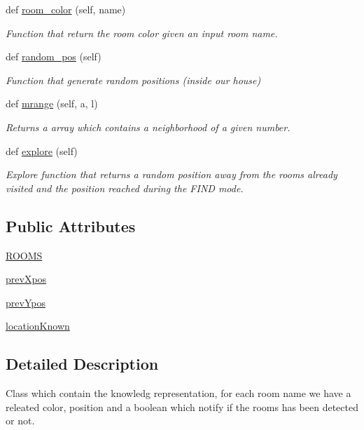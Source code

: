 \begin{DoxyCompactItemize}
def \hyperlink{classknowledgeRep_1_1Rooms_a41f6960d862a174fce8200ea1c7e003f}{room\+\_\+color} (self, name)
\begin{DoxyCompactList}\small\item\em Function that return the room color given an input room name. \end{DoxyCompactList}\item 
def \hyperlink{classknowledgeRep_1_1Rooms_ae666c5c43dcaa315e41d7e8de7ae88a2}{random\+\_\+pos} (self)
\begin{DoxyCompactList}\small\item\em Function that generate random positions (inside our house) \end{DoxyCompactList}\item 
def \hyperlink{classknowledgeRep_1_1Rooms_a76e0ae78dfe758ff25dd132ce74192e6}{mrange} (self, a, l)
\begin{DoxyCompactList}\small\item\em Returns a array which contains a neighborhood of a given number. \end{DoxyCompactList}\item 
def \hyperlink{classknowledgeRep_1_1Rooms_accce73bac346a3d2944e9d58c16dd738}{explore} (self)
\begin{DoxyCompactList}\small\item\em Explore function that returns a random position away from the rooms already visited and the position reached during the F\+I\+ND mode. \end{DoxyCompactList}\end{DoxyCompactItemize}
\subsection*{Public Attributes}
\begin{DoxyCompactItemize}
\item 
\hyperlink{classknowledgeRep_1_1Rooms_ae173d3ce96883c1e1cbcd3c67e045605}{R\+O\+O\+MS}
\item 
\hyperlink{classknowledgeRep_1_1Rooms_a41d3fe644e24332f8d5ce1ea1fd3d036}{prev\+Xpos}
\item 
\hyperlink{classknowledgeRep_1_1Rooms_abca079e9384306484df7407762e2c1cc}{prev\+Ypos}
\item 
\hyperlink{classknowledgeRep_1_1Rooms_ab43e8f7de2083bf7da36585822931688}{location\+Known}
\end{DoxyCompactItemize}


\subsection{Detailed Description}
Class which contain the knowledg representation, for each room name we have a releated color, position and a boolean which notify if the rooms has been detected or not. 



